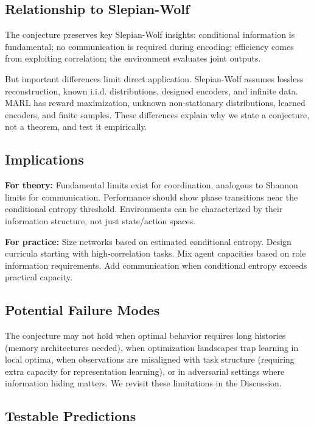 \documentclass[10pt, letterpaper]{article}
\begin{document}
\subsection{Relationship to Slepian-Wolf}

The conjecture preserves key Slepian-Wolf insights: conditional information is fundamental; no communication is required during encoding; efficiency comes from exploiting correlation; the environment evaluates joint outputs.

But important differences limit direct application. Slepian-Wolf assumes lossless reconstruction, known i.i.d. distributions, designed encoders, and infinite data. MARL has reward maximization, unknown non-stationary distributions, learned encoders, and finite samples. These differences explain why we state a conjecture, not a theorem, and test it empirically.

\subsection{Implications}

\textbf{For theory:} Fundamental limits exist for coordination, analogous to Shannon limits for communication. Performance should show phase transitions near the conditional entropy threshold. Environments can be characterized by their information structure, not just state/action spaces.

\textbf{For practice:} Size networks based on estimated conditional entropy. Design curricula starting with high-correlation tasks. Mix agent capacities based on role information requirements. Add communication when conditional entropy exceeds practical capacity.

\subsection{Potential Failure Modes}

The conjecture may not hold when optimal behavior requires long histories (memory architectures needed), when optimization landscapes trap learning in local optima, when observations are misaligned with task structure (requiring extra capacity for representation learning), or in adversarial settings where information hiding matters. We revisit these limitations in the Discussion.

\subsection{Testable Predictions}
\end{document}
